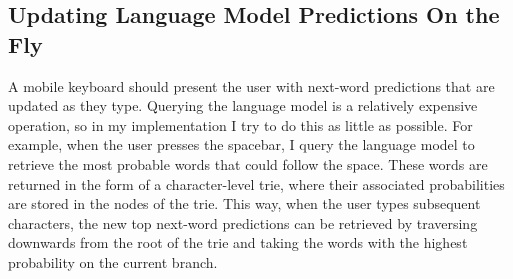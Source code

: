 \documentclass[a4paper, 12pt]{report}
\begin{document}
\subsection{Updating Language Model Predictions On the Fly}

A mobile keyboard should present the user with next-word predictions that are updated as they type. Querying the language model is a relatively expensive operation, so in my implementation I try to do this as little as possible. For example, when the user presses the spacebar, I query the language model to retrieve the most probable words that could follow the space. These words are returned in the form of a character-level trie, where their associated probabilities are stored in the nodes of the trie. This way, when the user types subsequent characters, the new top next-word predictions can be retrieved by traversing downwards from the root of the trie and taking the words with the highest probability on the current branch. \\
\end{document}
